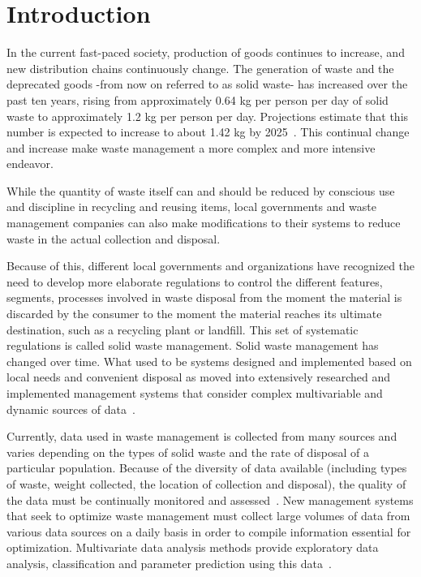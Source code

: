 \section{Introduction}

In the current fast-paced society,  production of goods continues to 
increase, and new distribution chains continuously change. The generation 
of waste and the deprecated goods -from now on referred to as solid waste- 
has increased over the past ten years, rising from approximately 0.64 kg 
per person per day of solid waste to approximately 1.2 kg per person per day. 
Projections estimate that this number is expected to increase to about 
1.42 kg by 2025~\cite{hoornweg2012}. This continual change and increase make 
waste management a more complex and more intensive endeavor.  

While the quantity of waste itself can and should be reduced by conscious use 
and discipline in recycling and reusing items, local governments and waste 
management companies can also make modifications to their systems to reduce 
waste in the actual collection and disposal.

Because of this, different local governments and organizations have recognized 
the need to develop more elaborate regulations to control the different 
features, segments, processes involved in waste disposal from the moment the 
material is discarded by the consumer to the moment the material reaches its 
ultimate destination, such as a recycling plant or landfill. This set of 
systematic regulations is called solid waste management. Solid waste 
management has changed over time.  What used to be systems designed and 
implemented based on local needs and convenient disposal as moved into 
extensively researched and implemented management systems that consider 
complex multivariable and dynamic sources of data~\cite{akbarpour2016}.

Currently, data used in waste management is collected from many sources and 
varies depending on the types of solid waste and the rate of disposal of a 
particular population. Because of the diversity of data available
 (including types of waste, weight collected, the location of collection and 
disposal), the quality of the data must be continually monitored and 
assessed~\cite{chandrappa2012}. New management systems that seek to optimize 
waste management must collect large volumes of data from various data sources 
on a daily basis in order to compile information essential for optimization.  
Multivariate data analysis methods provide exploratory data analysis, 
classification and parameter prediction using this data~\cite{bohm2013}. 

